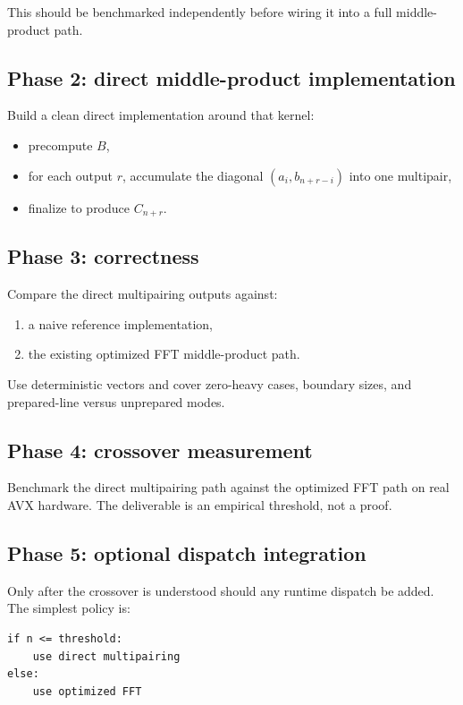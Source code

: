 \documentclass[11pt]{article}
\begin{document}
This should be benchmarked independently before wiring it into a full
middle-product path.

\subsection{Phase 2: direct middle-product implementation}

Build a clean direct implementation around that kernel:
\begin{itemize}[itemsep=0.3em, topsep=0.4em]
  \item precompute $B$,
  \item for each output $r$, accumulate the diagonal
  $(a_i, b_{n+r-i})$ into one multipair,
  \item finalize to produce $C_{n+r}$.
\end{itemize}

\subsection{Phase 3: correctness}

Compare the direct multipairing outputs against:
\begin{enumerate}[itemsep=0.3em, topsep=0.4em]
  \item a naive reference implementation,
  \item the existing optimized FFT middle-product path.
\end{enumerate}

Use deterministic vectors and cover zero-heavy cases, boundary sizes, and
prepared-line versus unprepared modes.

\subsection{Phase 4: crossover measurement}

Benchmark the direct multipairing path against the optimized FFT path on real
AVX hardware.
The deliverable is an empirical threshold, not a proof.

\subsection{Phase 5: optional dispatch integration}

Only after the crossover is understood should any runtime dispatch be added.
The simplest policy is:
\begin{lstlisting}
if n <= threshold:
    use direct multipairing
else:
    use optimized FFT
\end{lstlisting}
\end{document}
